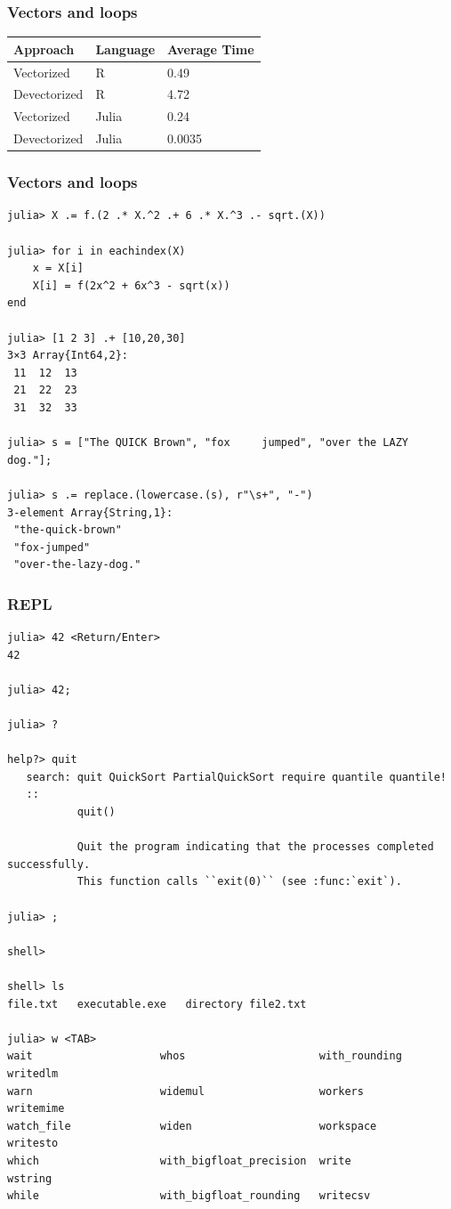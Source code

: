 \begin{frame}[fragile]
	\frametitle{Vectors and loops}
\begin{table}
\small
\begin{tabular}{*{3}{l}}
Approach & Language & Average Time \\
\hline
Vectorized & R & 0.49 \\
Devectorized & R & 4.72 \\
Vectorized & Julia & 0.24 \\
Devectorized & Julia & 0.0035 \\
\end{tabular}
\end{table}
\end{frame}

\begin{frame}[fragile]
	\frametitle{Vectors and loops}
  \begin{tiny}
  \begin{verbatim}
julia> X .= f.(2 .* X.^2 .+ 6 .* X.^3 .- sqrt.(X))

julia> for i in eachindex(X)
    x = X[i]
    X[i] = f(2x^2 + 6x^3 - sqrt(x))
end

julia> [1 2 3] .+ [10,20,30]
3×3 Array{Int64,2}:
 11  12  13
 21  22  23
 31  32  33

julia> s = ["The QUICK Brown", "fox     jumped", "over the LAZY dog."];

julia> s .= replace.(lowercase.(s), r"\s+", "-")
3-element Array{String,1}:
 "the-quick-brown"   
 "fox-jumped"        
 "over-the-lazy-dog."
  \end{verbatim}
  \end{tiny}
\end{frame}

\begin{frame}[fragile]
	\frametitle{REPL}
  \begin{tiny}
  \begin{verbatim}
julia> 42 <Return/Enter>
42

julia> 42;

julia> ?

help?> quit
   search: quit QuickSort PartialQuickSort require quantile quantile!
   ::
           quit()

           Quit the program indicating that the processes completed successfully.
           This function calls ``exit(0)`` (see :func:`exit`).

julia> ;

shell>

shell> ls
file.txt   executable.exe   directory file2.txt

julia> w <TAB>
wait                    whos                     with_rounding            writedlm
warn                    widemul                  workers                  writemime
watch_file              widen                    workspace                writesto
which                   with_bigfloat_precision  write                    wstring
while                   with_bigfloat_rounding   writecsv
  \end{verbatim}
  \end{tiny}
\end{frame}
